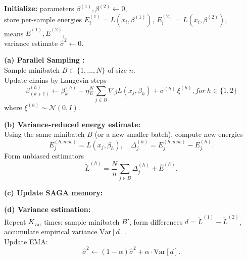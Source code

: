 \documentclass{article}
\begin{document}
\begin{algorithm}[H]
\caption{SAGA Variance-Reduced reSGLD with Replica Exchange}
\label{alg:saga-vr-resgld}

\textbf{Initialize:} 
parameters $\beta^{(1)},\beta^{(2)} \gets 0$, \\
store per-sample energies $E_i^{(1)} = L(x_i,\beta^{(1)})$, 
$E_i^{(2)} = L(x_i,\beta^{(2)})$, \\
means $\bar{E}^{(1)}, \bar{E}^{(2)}$, \\
variance estimate $\hat{\sigma}^2 \gets 0$.\\

{\textbf{(a) Parallel Sampling :} \\
    Sample minibatch $B \subset \{1,\dots,N\}$ of size $n$. \\
  Update chains by Langevin steps
  \[
    \beta_{(k+1)}^{(h)} \gets \beta_k^{(h)} - \eta \tfrac{N}{n} \sum_{j\in B} \nabla_\beta L(x_j, \beta_h) + \sigma^{(h)} \,\xi^{(h)}, for\ h\in\{1, 2\}
  \]
  where $\xi^{(h)} \sim \mathcal{N}(0,I)$.
  
  \vspace{0.25em}
  \textbf{(b) Variance-reduced energy estimate:} \\
  Using the same minibatch $B$ (or a new smaller batch), compute new energies
  \[
    E_j^{(h,new)} = L(x_j, \beta_h), \quad 
    \Delta_j^{(h)} = E_j^{(h,new)} - E_j^{(h)}.
  \]
  Form unbiased estimators
  \[
    \tilde{L}^{(h)} = \frac{N}{n} \sum_{j \in B} \Delta_j^{(h)} + \bar{E}^{(h)}.
  \]

  \vspace{0.25em}
  \textbf{(c) Update SAGA memory:} \\

  
  \vspace{0.25em}
  \textbf{(d) Variance estimation:} \\
  Repeat $K_{\text{var}}$ times: sample minibatch $B'$, form differences 
  $d = \tilde{L}^{(1)} - \tilde{L}^{(2)}$, 
  accumulate empirical variance $\mathrm{Var}[d]$. \\
  Update EMA:
  \[
    \hat{\sigma}^2 \gets (1-\alpha)\hat{\sigma}^2 + \alpha \cdot \mathrm{Var}[d].
  \]
  
}
\end{algorithm}
\end{document}
